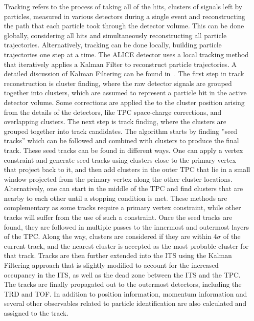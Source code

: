 Tracking refers to the process of taking all of the hits, clusters of signals left by particles, measured in various detectors during a single event and reconstructing the path that each particle took through the detector volume. This can be done globally, considering all hits and simultaneously reconstructing all particle trajectories. Alternatively, tracking can be done locally, building particle trajectories one step at a time. The ALICE detector uses a local tracking method that iteratively applies a Kalman Filter to reconstruct particle trajectories. A detailed discussion of Kalman Filtering can be found in~\cite{Kalman}.
The first step in track reconstruction is cluster finding, where the raw detector signals are grouped together into clusters, which are assumed to represent a particle hit in the active detector volume. Some corrections are applied the to the cluster position arising from the details of the detectors, like TPC space-charge corrections, and overlapping clusters. The next step is track finding, where the clusters are grouped together into track candidates. The algorithm starts by finding ”seed tracks” which can be followed and combined with clusters to produce the final track. These seed tracks can be found in different ways. One can apply a vertex constraint and generate seed tracks using clusters close to the primary vertex that project back to it, and then add clusters in the outer TPC that lie in a small window projected from the primary vertex along the other cluster locations. Alternatively, one can start in the middle of the TPC and find clusters that are nearby to each other until a stopping condition is met. These methods are complementary as some tracks require a primary vertex constraint, while other tracks will suffer from the use of such a constraint. Once the seed tracks are found, they are followed in multiple passes to the innermost and outermost layers of the TPC. Along the way, clusters are considered if they are within 4$\sigma$ of the current track, and the nearest cluster is accepted as the most probable cluster for that track. Tracks are then further extended into the ITS using the Kalman Filtering approach that is slightly modified to account for the increased occupancy in the ITS, as well as the dead zone between the ITS and the TPC. The tracks are finally propagated out to the outermost detectors, including the TRD and TOF. In addition to position information, momentum information and several other observables related to particle identification are also calculated and assigned to the track.

